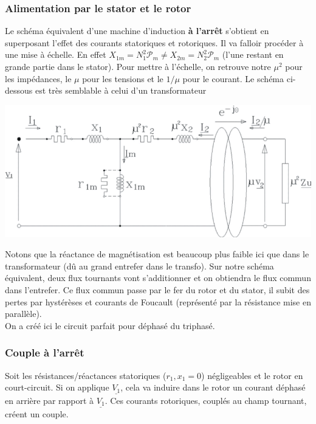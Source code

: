 		\newpage
		\subsubsection{Alimentation par le stator et le rotor}
		Le schéma équivalent d'une machine d'induction \textbf{à l’arrêt} s'obtient 
		en superposant l'effet des courants statoriques et rotoriques. Il va falloir 
		procéder à une mise à échelle. En effet $X_{1m} = N_1^2\mathcal{P}_m \neq 
		X_{2m} = N_2^2\mathcal{P}_m$ (l'une restant en grande partie dans le stator). 
		Pour mettre à l'échelle, on retrouve notre $\mu^2$ pour les impédances, 
		le $\mu$ pour les tensions et le $1/\mu$ pour le courant. Le schéma ci-dessous
		est très semblable à celui d'un transformateur
		
		\begin{center}
		\includegraphics[scale=0.5]{ch5/image21.png}
		\end{center}		
		Notons que la réactance de magnétisation est beaucoup plus faible ici que 
		dans le transformateur (dû au grand entrefer dans le transfo). Sur notre 
		schéma équivalent, deux flux tournants vont s'additionner et on obtiendra 
		le flux commun dans l'entrefer.  Ce flux commun passe par le fer du rotor 
		et du stator, il subit des pertes par hystérèses et courants de Foucault 
		(représenté par la résistance mise en parallèle).\\
		On a créé ici le circuit parfait pour déphasé du triphasé.
		
		\subsubsection{Couple à l’arrêt}
		Soit les résistances/réactances statoriques ($r_1,x_1=0$) négligeables et
		le rotor en court-circuit. Si on applique $\underline{V_1}$, cela va induire 
		dans le rotor un courant déphasé en arrière par rapport à $\underline{V_1}$. 
		Ces courants rotoriques, couplés au champ tournant, créent un couple.
		
